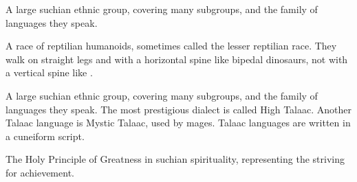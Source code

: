 \documentclass
  [a4paper,
   12pt,
   oneside
  ]%
  {article}
\begin{document}
\begin{gloss}
\begin{comment}
\paragraph{Saphyr}
\end{comment}
A large suchian ethnic group, covering many subgroups, and the family of languages they speak. 



\begin{comment}
\paragraph{\scatha}
\end{comment}
\gitem[\scathae]{\scatha}
A race of reptilian humanoids, sometimes called the lesser reptilian race.
They walk on straight legs and with a horizontal spine like bipedal dinosaurs, not with a vertical spine like \humans. 



\begin{comment}
\paragraph{Talaac}
\end{comment}
A large suchian ethnic group, covering many subgroups, and the family of languages they speak. 
The most prestigious dialect is called High Talaac.
Another Talaac language is Mystic Talaac, used by mages.
Talaac languages are written in a cuneiform script. 



\begin{comment}
\paragraph{Zotha}
\end{comment}
The Holy Principle of Greatness in suchian spirituality, representing the striving for achievement.





















\end{gloss}
\end{document}
